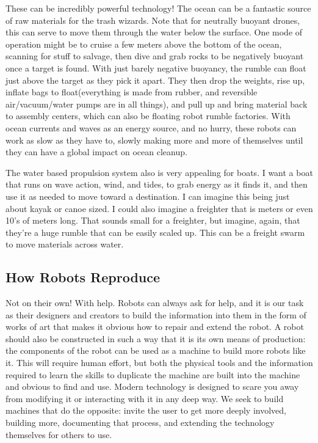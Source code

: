 \documentclass[11pt]{article}
\begin{document}
These can be incredibly powerful technology! The ocean can be a
fantastic source of raw materials for the trash wizards. Note that for
neutrally buoyant drones, this can serve to move them through the water
below the surface. One mode of operation might be to cruise a few meters
above the bottom of the ocean, scanning for stuff to salvage, then dive
and grab rocks to be negatively buoyant once a target is found. With
just barely negative buoyancy, the rumble can float just above the
target as they pick it apart. They then drop the weights, rise up,
inflate bags to float(everything is made from rubber, and reversible
air/vacuum/water pumps are in all things), and pull up and bring
material back to assembly centers, which can also be floating robot
rumble factories. With ocean currents and waves as an energy source, and
no hurry, these robots can work as slow as they have to, slowly making
more and more of themselves until they can have a global impact on ocean
cleanup.

The water based propulsion system also is very appealing for boats. I
want a boat that runs on wave action, wind, and tides, to grab energy as
it finds it, and then use it as needed to move toward a destination. I
can imagine this being just about kayak or canoe sized. I could also
imagine a freighter that is meters or even 10's of meters long. That
sounds small for a freighter, but imagine, again, that they're a huge
rumble that can be easily scaled up. This can be a freight swarm to move
materials across water.

\subsection{How Robots Reproduce}\label{how-robots-reproduce}

Not on their own! With help. Robots can always ask for help, and it is
our task as their designers and creators to build the information into
them in the form of works of art that makes it obvious how to repair and
extend the robot. A robot should also be constructed in such a way that
it is its own means of production: the components of the robot can be
used as a machine to build more robots like it. This will require human
effort, but both the physical tools and the information required to
learn the skills to duplicate the machine are built into the machine and
obvious to find and use. Modern technology is designed to scare you away
from modifying it or interacting with it in any deep way. We seek to
build machines that do the opposite: invite the user to get more deeply
involved, building more, documenting that process, and extending the
technology themselves for others to use.
\end{document}
